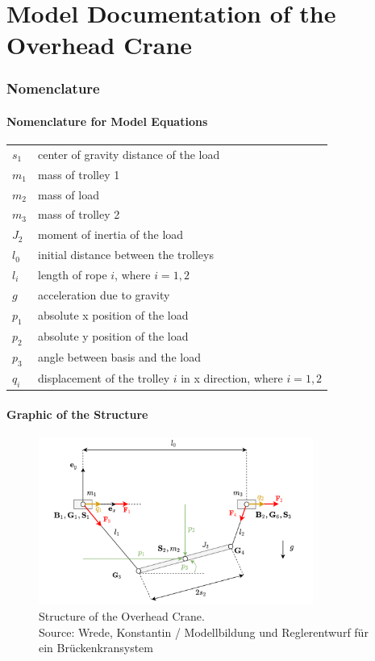 \documentclass[10pt,a4paper]{article}
\begin{document}
	\part*{Model Documentation of the \\ Overhead Crane} %
	
	
	\section{Nomenclature} %
	\subsection{Nomenclature for Model Equations} %
	
	\begin{tabular}{ll}
		$s_1$ & center of gravity distance of the load \\
		$m_1$ & mass of trolley 1 \\
		$m_2$ & mass of load \\
		$m_3$ & mass of trolley 2 \\
		$J_2$ & moment of inertia of the load \\
		$l_0$ & initial distance between the trolleys \\
		$l_i$ & length of rope $i$, where $i = 1,2$ \\
		$g$ & acceleration due to gravity \\
		$p_1$ & absolute x position of the load\\
		$p_2$ & absolute y position of the load\\
		$p_3$ & angle between basis and the load\\
		$q_i$ & displacement of the trolley $i$ in x direction, where $i = 1,2$\\		
	\end{tabular}
	 
	\subsection{Graphic of the Structure}	
	\begin{figure}[H]
		\centering
		\captionsetup{justification=centering, margin=1cm}
		\includegraphics[width=90mm]{over_crane.pdf}
		\caption{Structure of the Overhead Crane. \\ 
		\footnotesize{Source: Wrede, Konstantin / Modellbildung und Reglerentwurf für ein Brückenkransystem }}
	\end{figure}
\end{document}

